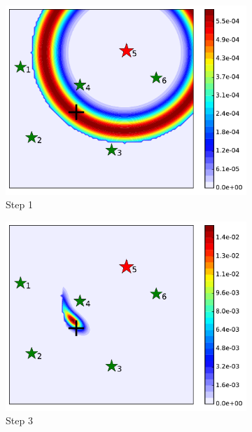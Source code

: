 \documentclass[journal]{IEEEtranTIE}
\theoremstyle{remark}
\begin{document}
\begin{figure}%
	\centering
	\begin{subfigure}{0.23\textwidth}%
		\includegraphics[width=\textwidth]{figures/hetero_sta_sen_sta_tar_rbt5_step1}
		\caption{Step 1}\label{fig:htr_sta_sen_sta_tar_sing1}
	\end{subfigure}
	\begin{subfigure}{0.23\textwidth}%
		\includegraphics[width=\textwidth]{figures/hetero_sta_sen_sta_tar_rbt5_step3}
		\caption{Step 3}\label{fig:htr_sta_sen_sta_tar_sing2}
	\end{subfigure}
	\begin{subfigure}{0.23\textwidth}%

\end{subfigure}
\end{figure}
\end{document}
